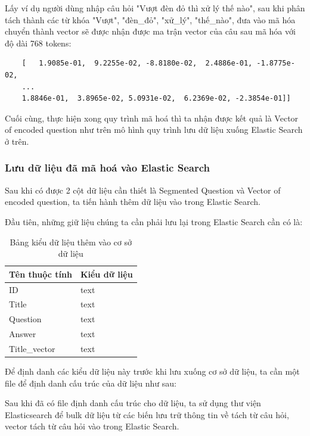 Lấy ví dụ người dùng nhập câu hỏi "Vượt đèn đỏ thì xử lý thế nào", sau khi phân tách thành các từ khóa "Vượt", "đèn\_đỏ", "xử\_lý", "thế\_nào", đưa vào mã hóa chuyển thành vector sẽ được nhận được ma trận vector của câu sau mã hóa với độ dài 768 tokens:

\begin{lstlisting}
	[ 	1.9085e-01,  9.2255e-02, -8.8180e-02,  2.4886e-01, -1.8775e-02,
	...
	1.8846e-01,  3.8965e-02, 5.0931e-02,  6.2369e-02, -2.3854e-01]]
\end{lstlisting}

Cuối cùng, thực hiện xong quy trình mã hoá thì ta nhận được kết quả là Vector of encoded question như trên mô hình quy trình lưu dữ liệu xuống Elastic Search ở trên.

\subsubsection{Lưu dữ liệu đã mã hoá vào Elastic Search}

Sau khi có được 2 cột dữ liệu cần thiết là Segmented Question và Vector of encoded question, ta tiến hành thêm dữ liệu vào trong Elastic Search.

Đầu tiên, những giữ liệu chúng ta cần phải lưu lại trong Elastic Search cần có là:

\begin{table}[htp]
	\centering
	\caption{Bảng kiểu dữ liệu thêm vào cơ sở dữ liệu}
	\begin{tabular}{|l|l|}
		\hline
		Tên thuộc tính & Kiểu dữ liệu \\ \hline
		ID             & text         \\ \hline
		Title          & text         \\ \hline
		Question       & text         \\ \hline
		Answer         & text         \\ \hline
		Title\_vector  & text         \\ \hline
	\end{tabular}
	\label{tab:data-type-table}
\end{table}

\pagebreak
Để định danh các kiểu dữ liệu này trước khi lưu xuống cơ sở dữ liệu, ta cần một file để định danh cấu trúc của dữ liệu như sau:



Sau khi đã có file định danh cấu trúc cho dữ liệu, ta sử dụng thư viện Elasticsearch để bulk dữ liệu từ các biến lưu trữ thông tin về tách từ câu hỏi, vector tách từ câu hỏi vào trong Elastic Search.

